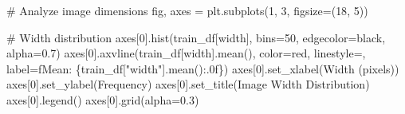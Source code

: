 \documentclass[
  letterpaper,
  DIV=11,
  numbers=noendperiod]{scrartcl}
\newenvironment{Shaded}{\begin{snugshade}}{\end{snugshade}}
\newcommand{\CommentTok}[1]{\textcolor[rgb]{0.37,0.37,0.37}{#1}}
\newcommand{\DecValTok}[1]{\textcolor[rgb]{0.68,0.00,0.00}{#1}}
\newcommand{\FloatTok}[1]{\textcolor[rgb]{0.68,0.00,0.00}{#1}}
\newcommand{\NormalTok}[1]{\textcolor[rgb]{0.00,0.23,0.31}{#1}}
\newcommand{\OperatorTok}[1]{\textcolor[rgb]{0.37,0.37,0.37}{#1}}
\newcommand{\SpecialCharTok}[1]{\textcolor[rgb]{0.37,0.37,0.37}{#1}}
\newcommand{\SpecialStringTok}[1]{\textcolor[rgb]{0.13,0.47,0.30}{#1}}
\newcommand{\StringTok}[1]{\textcolor[rgb]{0.13,0.47,0.30}{#1}}
\renewenvironment{Shaded}{%
  \begin{tcolorbox}[%
    enhanced,%
    colback=codebg,%
    colframe=codebg,%
    borderline west={3pt}{0pt}{sectionblue},%
    boxrule=0pt,%
    arc=0pt,%
    boxsep=5pt,%
    left=2mm,%
    right=2mm,%
    top=2mm,%
    bottom=2mm%
  ]%
}{%
  \end{tcolorbox}%
}
\begin{document}
\begin{Shaded}
\begin{Highlighting}[]
\CommentTok{\# Analyze image dimensions}
\NormalTok{fig, axes }\OperatorTok{=}\NormalTok{ plt.subplots(}\DecValTok{1}\NormalTok{, }\DecValTok{3}\NormalTok{, figsize}\OperatorTok{=}\NormalTok{(}\DecValTok{18}\NormalTok{, }\DecValTok{5}\NormalTok{))}

\CommentTok{\# Width distribution}
\NormalTok{axes[}\DecValTok{0}\NormalTok{].hist(train\_df[}\StringTok{\textquotesingle{}width\textquotesingle{}}\NormalTok{], bins}\OperatorTok{=}\DecValTok{50}\NormalTok{, edgecolor}\OperatorTok{=}\StringTok{\textquotesingle{}black\textquotesingle{}}\NormalTok{, alpha}\OperatorTok{=}\FloatTok{0.7}\NormalTok{)}
\NormalTok{axes[}\DecValTok{0}\NormalTok{].axvline(train\_df[}\StringTok{\textquotesingle{}width\textquotesingle{}}\NormalTok{].mean(), color}\OperatorTok{=}\StringTok{\textquotesingle{}red\textquotesingle{}}\NormalTok{, linestyle}\OperatorTok{=}\StringTok{\textquotesingle{}{-}{-}\textquotesingle{}}\NormalTok{,}
\NormalTok{                   label}\OperatorTok{=}\SpecialStringTok{f\textquotesingle{}Mean: }\SpecialCharTok{\{}\NormalTok{train\_df[}\StringTok{"width"}\NormalTok{]}\SpecialCharTok{.}\NormalTok{mean()}\SpecialCharTok{:.0f\}}\SpecialStringTok{\textquotesingle{}}\NormalTok{)}
\NormalTok{axes[}\DecValTok{0}\NormalTok{].set\_xlabel(}\StringTok{\textquotesingle{}Width (pixels)\textquotesingle{}}\NormalTok{)}
\NormalTok{axes[}\DecValTok{0}\NormalTok{].set\_ylabel(}\StringTok{\textquotesingle{}Frequency\textquotesingle{}}\NormalTok{)}
\NormalTok{axes[}\DecValTok{0}\NormalTok{].set\_title(}\StringTok{\textquotesingle{}Image Width Distribution\textquotesingle{}}\NormalTok{)}
\NormalTok{axes[}\DecValTok{0}\NormalTok{].legend()}
\NormalTok{axes[}\DecValTok{0}\NormalTok{].grid(alpha}\OperatorTok{=}\FloatTok{0.3}\NormalTok{)}


\end{Highlighting}
\end{Shaded}
\end{document}
